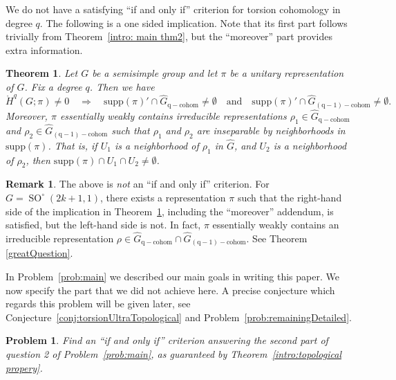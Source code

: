 \documentclass[12pt,reqno]{amsart}
\newtheorem{prob}[theorem]{Problem}
\newtheorem{mainthm}{Theorem}
\theoremstyle{definition}
\newtheorem{remark}[theorem]{Remark}
\newcommand{\SO}{\operatorname{SO}}
\newcommand{\torH}{\mathring{H}}
\begin{document}
We do not have a satisfying ``if and only if'' criterion for torsion cohomology in degree $q$.  
The following is a one sided implication.
Note that its first part follows trivially from Theorem~\ref{intro: main thm2},
but the ``moreover'' part provides extra information.

\begin{mainthm}\label{intro: main thm1}
    Let $G$ be a semisimple group and let $\pi$ be a unitary representation of $G$.
    Fix a degree $q$. Then we have
     \[ \torH^q(G;\pi)\neq 0 \quad \Longrightarrow \quad \mathrm{supp}(\pi)' \cap \widehat{G}_{\mathrm{q-cohom}} \neq \emptyset \quad \mbox{and}\quad  \mathrm{supp}(\pi)' \cap \widehat{G}_{\mathrm{(q-1)-cohom}} \neq \emptyset.\]
    Moreover, $\pi$ essentially weakly contains irreducible representations $\rho_1\in \widehat{G}_{\mathrm{q-cohom}}$ and $\rho_2\in \widehat{G}_{\mathrm{(q-1)-cohom}}$ such that $\rho_1$ and $\rho_2$ are inseparable by neighborhoods in $\mathrm{supp}(\pi)$. That is, if $U_1$ is a neighborhood of $\rho_1$ in $\widehat{G}$, and $U_2$ is a neighborhood of $\rho_2$, then $\mathrm{supp}(\pi) \cap U_1 \cap  U_2 \ne \emptyset$.
\end{mainthm}

\begin{remark} \label{rem:SL2C}
    The above is \emph{not} an ``if and only if'' criterion.
    For $G=\SO^\circ(2k+1,1)$, there exists a representation $\pi$ such that the right-hand side of the implication in Theorem~\ref{intro: main thm1}, including the ``moreover'' addendum, is satisfied, but the left-hand side is not. In fact, $\pi$ essentially weakly contains an irreducible representation $\rho\in \widehat{G}_{\mathrm{q-cohom}} \cap \widehat{G}_{\mathrm{(q-1)-cohom}}$. See Theorem \ref{greatQuestion}.
\end{remark}

In Problem~\ref{prob:main} we described our main goals in writing this paper.
We now specify the part that we did not achieve here.
A precise conjecture which regards this problem will be given later, see Conjecture~\ref{conj:torsionUltraTopological} and Problem~\ref{prob:remainingDetailed}.
\begin{prob}\label{prob:remaining}
    Find an ``if and only if'' criterion answering the second part of question 2 of Problem~\ref{prob:main}, as guaranteed by Theorem~\ref{intro:topological propery}.
\end{prob}
\end{document}
